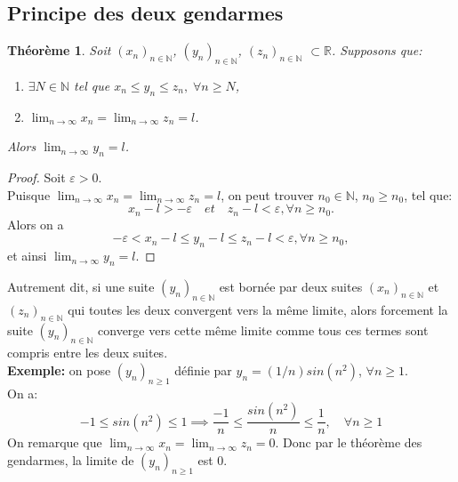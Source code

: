 \documentclass[a4paper, 12pt, french, twoside]{article}
\newtheorem{theorem}{Théorème}[section]
\newcommand{\Nn}{{\mathbb{N}}}
\newcommand{\Rr}{{\mathbb{R}}}
\begin{document}
\subsection{Principe des deux gendarmes}
\begin{theorem}
    Soit $(x_n)_{n\in\Nn}$, $(y_n)_{n\in\Nn}$, $(z_n)_{n\in\Nn}$ $\subset \Rr$. Supposons que:
\begin{enumerate}
    \item $\exists N \in \Nn$ tel que $x_n\leq y_n\leq z_n, \; \forall n\geq N$,
    \item $\lim_{n\rightarrow\infty}x_n=\lim_{n\rightarrow\infty}z_n=l$.
\end{enumerate}
Alors $\lim_{n\rightarrow\infty}y_n=l$.

\end{theorem}

\begin{proof}
    Soit $\varepsilon>0$.
\\Puisque $\lim_{n\rightarrow\infty}x_n=\lim_{n\rightarrow\infty}z_n=l$, on peut trouver $n_0\in\Nn$, $n_0\geq n_0$, tel que:
\begin{equation*}
    x_n-l>-\varepsilon \quad et \quad z_n-l<\varepsilon, \forall n \geq n_0.
\end{equation*}
Alors on a 
\begin{equation*}
    -\varepsilon<x_n-l\leq y_n-l \leq z_n-l < \varepsilon, \forall n \geq n_0,
\end{equation*}
et ainsi $\lim_{n\rightarrow\infty}y_n=l.  $
\end{proof}



Autrement dit, si une suite $(y_n)_{n\in\Nn}$ est bornée par deux suites $(x_n)_{n\in\Nn}$ et $(z_n)_{n\in\Nn}$ qui toutes les deux convergent vers la même limite, alors forcement la suite $(y_n)_{n\in\Nn}$ converge vers cette même limite comme tous ces termes sont compris entre les deux suites.
\\\textbf{Exemple:} on pose $(y_n)_{n\geq1}$ définie par $y_n=(1/n)sin(n^2)$, $\forall n \geq1$. 
\\On a:
\begin{equation*}
    -1\leq sin(n^2)\leq1 \implies \frac{-1}{n} \leq \frac{sin(n^2)}{n}\leq \frac{1}{n} , \quad \forall n \geq1
\end{equation*}
On remarque que $\lim_{n\rightarrow\infty}x_n=\lim_{n\rightarrow\infty}z_n=0$.
Donc par le théorème des gendarmes, la limite de $(y_n)_{n\geq1}$ est 0. \\
\end{document}
